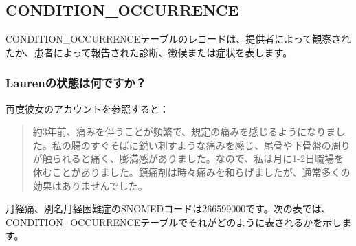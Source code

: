 \documentclass[
  11pt]{book}
\theoremstyle{definition}
\theoremstyle{definition}
\theoremstyle{definition}
\theoremstyle{definition}
\theoremstyle{remark}
\begin{document}
\subsection{CONDITION\_OCCURRENCE}\label{conditionOccurrence}

CONDITION\_OCCURRENCEテーブルのレコードは、提供者によって観察されたか、患者によって報告された診断、徴候または症状を表します。

\subsubsection*{Laurenの状態は何ですか？}\label{laurenux306eux72b6ux614bux306fux4f55ux3067ux3059ux304b}

再度彼女のアカウントを参照すると：

\begin{quote}
約3年前、痛みを伴うことが頻繁で、規定の痛みを感じるようになりました。私の腸のすぐそばに鋭い刺すような痛みを感じ、尾骨や下骨盤の周りが触られると痛く、膨満感がありました。なので、私は月に1-2日職場を休むことがありました。鎮痛剤は時々痛みを和らげましたが、通常多くの効果はありませんでした。
\end{quote}

月経痛、別名月経困難症のSNOMEDコードは266599000です。次の表では、CONDITION\_OCCURRENCEテーブルでそれがどのように表されるかを示します。
\end{document}
